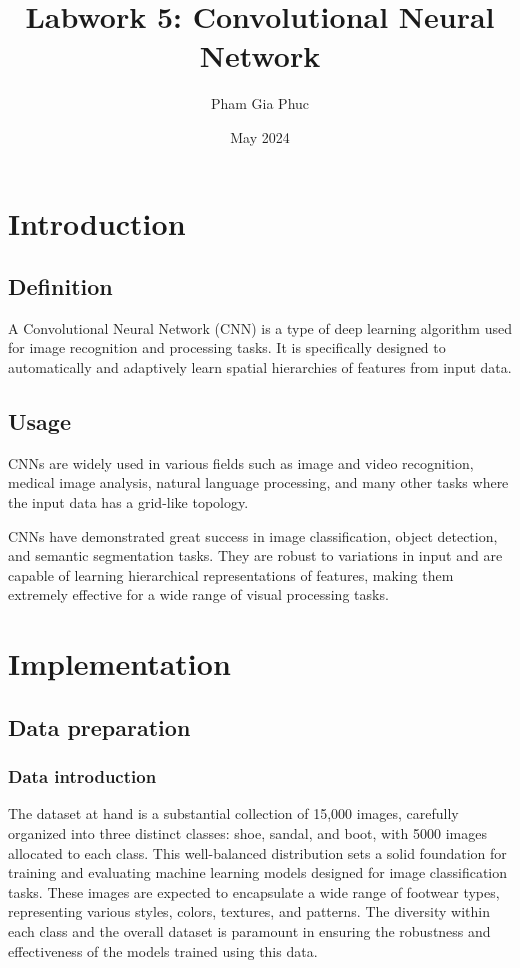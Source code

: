 \documentclass{article}
\title{Labwork 5: Convolutional Neural Network}
\author{Pham Gia Phuc}
\date{May 2024}
\begin{document}
\maketitle

\setlength\parindent{0pt}

\section{Introduction}

    \subsection{Definition}

    A Convolutional Neural Network (CNN) is a type of deep learning algorithm used for image recognition and processing tasks. It is specifically designed to automatically and adaptively learn spatial hierarchies of features from input data.
    
    \subsection{Usage}

    CNNs are widely used in various fields such as image and video recognition, medical image analysis, natural language processing, and many other tasks where the input data has a grid-like topology.

    CNNs have demonstrated great success in image classification, object detection, and semantic segmentation tasks. They are robust to variations in input and are capable of learning hierarchical representations of features, making them extremely effective for a wide range of visual processing tasks.
    
\section{Implementation}

    \subsection{Data preparation}

        \subsubsection{Data introduction}
            The dataset at hand is a substantial collection of 15,000 images, carefully organized into three distinct classes: shoe, sandal, and boot, with 5000 images allocated to each class. This well-balanced distribution sets a solid foundation for training and evaluating machine learning models designed for image classification tasks. These images are expected to encapsulate a wide range of footwear types, representing various styles, colors, textures, and patterns. The diversity within each class and the overall dataset is paramount in ensuring the robustness and effectiveness of the models trained using this data.
\end{document}
